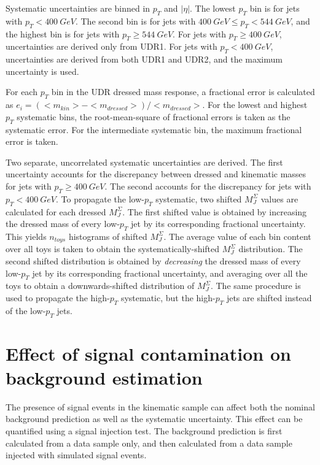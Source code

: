 Systematic uncertainties are binned in $p_{T}$ and $|\eta|$.
The lowest $p_{T}$ bin is for jets with $p_{T} < 400~GeV$.
The second bin is for jets with $400~GeV \leq p_T < 544~GeV$, and the highest bin is for jets with $p_T \geq 544~GeV$.
For jets with $p_{T} \geq 400~GeV$, uncertainties are derived only from UDR1.
For jets with $p_{T} < 400~GeV$, uncertainties are derived from both UDR1 and UDR2, and the maximum uncertainty is used.

For each $p_T$ bin in the UDR dressed mass response, a fractional error is calculated as $e_i=\left(<m_{kin}>-<m_{dressed}>\right)/<m_{dressed}>$.
For the lowest and highest $p_T$ systematic bins, the root-mean-square of fractional errors is taken as the systematic error.
For the intermediate systematic bin, the maximum fractional error is taken.

Two separate, uncorrelated systematic uncertainties are derived.
The first uncertainty accounts for the discrepancy between dressed and kinematic masses for jets with $p_T \geq 400~GeV$.
The second accounts for the discrepancy for jets with $p_T < 400~GeV$.
To propagate the low-$p_T$ systematic, two shifted $M_{J}^{\Sigma}$ values are calculated for each dressed $M_{J}^{\Sigma}$.
The first shifted value is obtained by increasing the dressed mass of every low-$p_T$ jet by its corresponding fractional uncertainty.
This yields $n_{toys}$ histograms of shifted $M_{J}^{\Sigma}$.
The average value of each bin content over all toys is taken to obtain the systematically-shifted $M_{J}^{\Sigma}$ distribution.
The second shifted distribution is obtained by \textit{decreasing} the dressed mass of every low-$p_T$ jet by its corresponding fractional uncertainty, and averaging over all the toys to obtain a downwards-shifted distribution of $M_{J}^{\Sigma}$.
The same procedure is used to propagate the high-$p_T$ systematic, but the high-$p_T$ jets are shifted instead of the low-$p_T$ jets.

\section{Effect of signal contamination on background estimation}\label{sec:signal_contamination}
The presence of signal events in the kinematic sample can affect both the nominal background prediction as well as the systematic uncertainty.
This effect can be quantified using a signal injection test.
The background prediction is first calculated from a data sample only, and then calculated from a data sample injected with simulated signal events.

